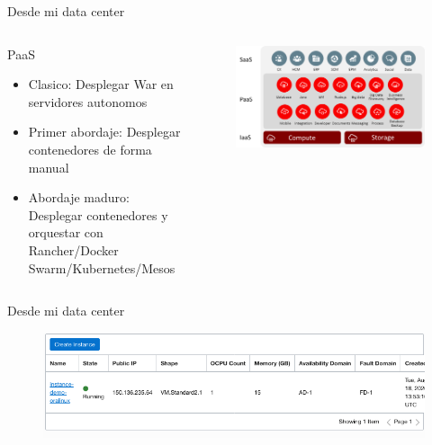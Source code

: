 \documentclass[aspectratio=169]{beamer}
\begin{document}
\begin{frame}[fragile]{Desde mi data center}


    \begin{columns}[T] %

        \begin{column}[T]{5cm} %
            PaaS
               \begin{itemize}
                   \item Clasico: Desplegar War en servidores autonomos
                   \item Primer abordaje: Desplegar contenedores de forma manual

                   \item Abordaje maduro: Desplegar contenedores y orquestar con Rancher/Docker Swarm/Kubernetes/Mesos
               \end{itemize}
        \end{column}
        \begin{column}[T]{7cm} %
            \begin{figure}
                \centering
                \includegraphics[width=\linewidth]{Images/cloud}
            \end{figure}
        \end{column}
    \end{columns}
\end{frame}

\begin{frame}[fragile]{Desde mi data center}
    \begin{figure}
        \centering
        \includegraphics[width=\linewidth]{Images/oracloud}
    \end{figure}
\end{frame}
\end{document}
